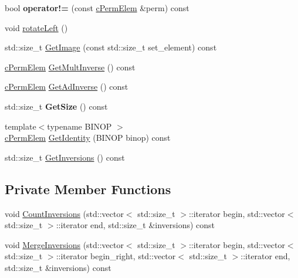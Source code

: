\begin{DoxyCompactItemize}
\item 
\hypertarget{classcPermElem_a925cdee12dcc4914417143a88d91c49d}{bool {\bfseries operator!=} (const \hyperlink{classcPermElem}{c\-Perm\-Elem} \&perm) const }\label{classcPermElem_a925cdee12dcc4914417143a88d91c49d}

\item 
void \hyperlink{classcPermElem_afa5694d1831e653f4cc3b12de6bb058e}{rotate\-Left} ()
\item 
std\-::size\-\_\-t \hyperlink{classcPermElem_adad3b042383cf3538bfec790188987c3}{Get\-Image} (const std\-::size\-\_\-t set\-\_\-element) const 
\item 
\hyperlink{classcPermElem}{c\-Perm\-Elem} \hyperlink{classcPermElem_adbb23b8a368e0d01cd2b450ad0be5efb}{Get\-Mult\-Inverse} () const 
\item 
\hyperlink{classcPermElem}{c\-Perm\-Elem} \hyperlink{classcPermElem_a11cc987f70282d2984c04c6e058c41e8}{Get\-Ad\-Inverse} () const 
\item 
\hypertarget{classcPermElem_a773fc9acee08d4c86d391439574eaf3e}{std\-::size\-\_\-t {\bfseries Get\-Size} () const }\label{classcPermElem_a773fc9acee08d4c86d391439574eaf3e}

\item 
{\footnotesize template$<$typename B\-I\-N\-O\-P $>$ }\\\hyperlink{classcPermElem}{c\-Perm\-Elem} \hyperlink{classcPermElem_a7f5392e3279b766d5f85c01d363c2941}{Get\-Identity} (B\-I\-N\-O\-P binop) const 
\item 
std\-::size\-\_\-t \hyperlink{classcPermElem_a06f75de000ad4b9524116a029800ca26}{Get\-Inversions} () const 
\end{DoxyCompactItemize}
\subsection*{Private Member Functions}
\begin{DoxyCompactItemize}
\item 
void \hyperlink{classcPermElem_abefedad75d8175a886b30a6d36a0eb98}{Count\-Inversions} (std\-::vector$<$ std\-::size\-\_\-t $>$\-::iterator begin, std\-::vector$<$ std\-::size\-\_\-t $>$\-::iterator end, std\-::size\-\_\-t \&inversions) const 
\item 
void \hyperlink{classcPermElem_aa39ae9f1b4d3efd38616ff822caebbb9}{Merge\-Inversions} (std\-::vector$<$ std\-::size\-\_\-t $>$\-::iterator begin, std\-::vector$<$ std\-::size\-\_\-t $>$\-::iterator begin\-\_\-right, std\-::vector$<$ std\-::size\-\_\-t $>$\-::iterator end, std\-::size\-\_\-t \&inversions) const 
\end{DoxyCompactItemize}
